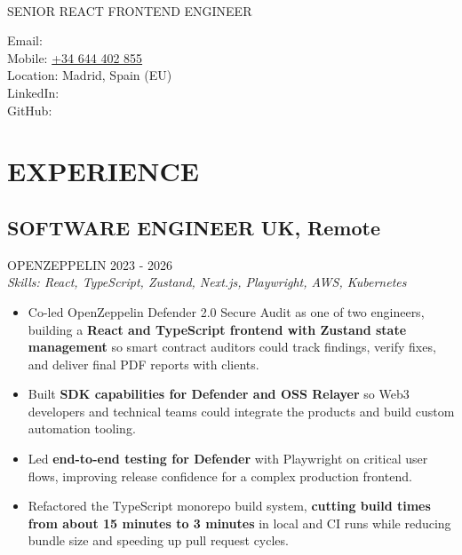\documentclass{article}
\newcommand{\WorkExperience}[2]{
   \subsection*{#1}
   \vspace{-1em}
   \uppercase{#2}
}
\newcommand{\Skills}[1]{
   \textit{Skills: #1}
}
\begin{document}
\begin{center}
	\begin{minipage}{0.5\textwidth}
		{\fontsize{24}{28}\Title{}} \\
		\bigskip
		{\normalsize \MakeUppercase{Senior React Frontend Engineer}}
	\end{minipage} \hfill
	\begin{minipage}{0.4\textwidth}
		\raggedleft{}
		Email: \href{mailto:\ResumeEmail}{\ResumeEmail} \\
		Mobile: \href{tel:+34644402855}{+34 644 402 855}  \\
		Location: Madrid, Spain (EU) \\
		LinkedIn: \href{\ResumeLinkedInUrl}{\ResumeLinkedInLabel} \\
		GitHub: \href{\ResumeGitHubUrl}{\ResumeGitHubLabel}
	\end{minipage}
\end{center}

\vspace{-3em}

\phantom{Amazon, Microsoft, Facebook} %

\section*{EXPERIENCE}
\WorkExperience{SOFTWARE ENGINEER \hfill UK, Remote}{OpenZeppelin \hfill 2023 {-} 2026} \\
\Skills{React, TypeScript, Zustand, Next.js, Playwright, AWS, Kubernetes}
\begin{itemize}
	\item Co-led OpenZeppelin Defender 2.0 Secure Audit as one of two engineers, building a \textbf{React and TypeScript frontend with Zustand state management} so smart contract auditors could track findings, verify fixes, and deliver final PDF reports with clients.
	\item Built \textbf{SDK capabilities for Defender and OSS Relayer} so Web3 developers and technical teams could integrate the products and build custom automation tooling.
	\item Led \textbf{end-to-end testing for Defender} with Playwright on critical user flows, improving release confidence for a complex production frontend.
	\item Refactored the TypeScript monorepo build system, \textbf{cutting build times from about 15 minutes to 3 minutes} in local and CI runs while reducing bundle size and speeding up pull request cycles.
\end{itemize}
\end{document}
